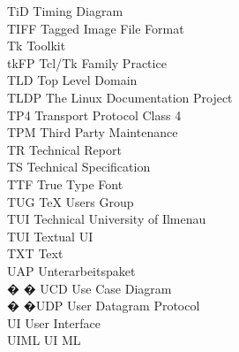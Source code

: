\begin{tabbing}

    \>TiD \>\>Timing Diagram\\

    \>TIFF \>\>Tagged Image File Format\\

    \>Tk \>\>Toolkit\\

    \>tkFP \>\>Tcl/Tk Family Practice\\

    \>TLD \>\>Top Level Domain\\

    \>TLDP \>\>The Linux Documentation Project\\


    \>TP4 \>\>Transport Protocol Class 4\\

    \>TPM \>\>Third Party Maintenance\\

    \>TR \>\>Technical Report\\

    \>TS \>\>Technical Specification\\

    \>TTF \>\>True Type Font\\

    \>TUG \>\>TeX Users Group\\

    \>TUI \>\>Technical University of Ilmenau\\

    \>TUI \>\>Textual UI\\

    \>TXT \>\>Text\\

    \>UAP \>\>Unterarbeitspaket\\


� � \>UCD \>\>Use Case Diagram\\

 � �\>UDP \>\>User Datagram Protocol\\

    \>UI \>\>User Interface\\

    \>UIML \>\>UI ML\\


\end{tabbing}
